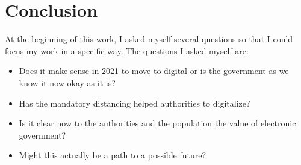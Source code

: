 \section{Conclusion}
\label{chap:conclusions}
At the beginning of this work, I asked myself several questions so that I could focus my work in a specific way. 
The questions I asked myself are:
\begin{itemize}
\item Does it make sense in 2021 to move to digital or is the government as we know it now okay as it is? 
\item Has the mandatory distancing helped authorities to digitalize?
\item Is it clear now to the authorities and the population the value of electronic government?
\item Might this actually be a path to a possible future?
\end{itemize}

